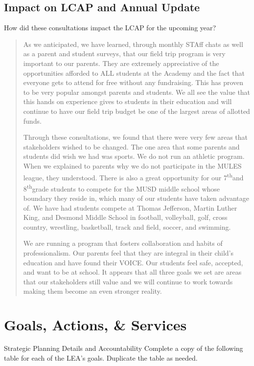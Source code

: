 \documentclass{article}
\renewcommand{\th}{\textsuperscript{th}}
\newcounter{goal}[section] %
\begin{document}
\subsection{Impact on LCAP and Annual Update}
How did these consultations impact the LCAP for the upcoming year?
\begin{quotation}
	As we anticipated, we have learned, through monthly STAff chats as well as a parent and student surveys, that our field trip program is very important to our parents. They are extremely appreciative of the opportunities afforded to ALL students at the Academy and the fact that everyone gets to attend for free without any fundraising. This has proven to be very popular amongst parents and students. We all see the value that this hands on experience gives to students in their education and will continue to have our field trip budget be one of the largest areas of allotted funds.

	Through these consultations, we found that there were very few areas that stakeholders wished to be changed. The one area that some parents and students did wish we had was sports. We do not run an athletic program. When we explained to parents why we do not participate in the MULES league, they understood. There is also a great opportunity for our 7\th and 8\th grade students to compete for the MUSD middle school whose boundary they reside in, which many of our students have taken advantage of. We have had students compete at Thomas Jefferson, Martin Luther King, and Desmond Middle School in football, volleyball, golf, cross country, wrestling, basketball, track and field, soccer, and swimming.

	We are running a program that fosters collaboration and habits of professionalism. Our parents feel that they are integral in their child's education and have found their VOICE. Our students feel safe, accepted, and want to be at school. It appears that all three goals we set are areas that our stakeholders still value and we will continue to work towards making them become an even stronger reality.
\end{quotation}

\section{Goals, Actions, \& Services}
Strategic Planning Details and Accountability\newline
Complete a copy of the following table for each of the LEA's goals. Duplicate the table as needed.
\end{document}
